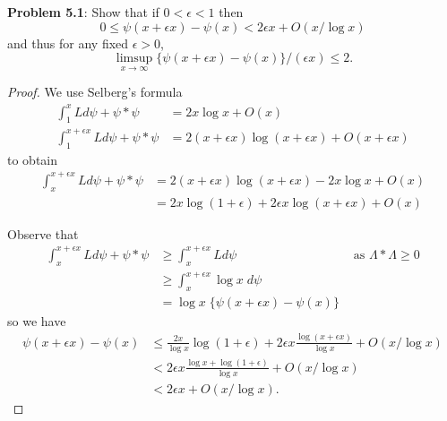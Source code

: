 \documentclass[12pt]{article}
\begin{document}
\fi

\textbf{Problem 5.1}: Show that if $0 < \epsilon < 1$ then
$$0 \leq \psi(x + \epsilon x) - \psi(x) < 2 \epsilon x + O(x / \log x)$$
and thus for any fixed $\epsilon > 0$,
$$\limsup_{x \rightarrow \infty} \{\psi(x + \epsilon x) - \psi(x)\}/(\epsilon x) \leq 2.$$

\begin{proof}
We use Selberg's formula
\begin{align*}
\int_1^x Ld\psi + \psi * \psi &= 2 x \log x + O(x)\\
\int_1^{x + \epsilon x} Ld\psi + \psi * \psi &= 2 (x + \epsilon x) \log (x + \epsilon x) + O(x + \epsilon x)
\end{align*}
to obtain
\begin{align*}
\int_x^{x + \epsilon x} Ld\psi + \psi * \psi &= 2 (x + \epsilon x) \log (x + \epsilon x) - 2 x \log x + O(x)\\
&= 2 x \log (1 + \epsilon) + 2 \epsilon x \log (x + \epsilon x) + O(x)
\end{align*}

Observe that
\begin{align*}
\int_x^{x + \epsilon x} Ld\psi + \psi * \psi &\geq \int_x^{x + \epsilon x} Ld\psi &\text{ as } \Lambda * \Lambda \geq 0 \\
&\geq \int_x^{x + \epsilon x} \log x \; d\psi\\
&= \log x \; \{ \psi(x + \epsilon x) - \psi(x) \}
\end{align*}
so we have
\begin{align*}
\psi(x + \epsilon x) - \psi(x) &\leq \frac{2 x}{\log x} \log (1 + \epsilon) + 2 \epsilon x \frac{\log (x + \epsilon x)}{\log x} + O(x / \log x)\\
&< 2 \epsilon x \frac{\log x + \log (1 + \epsilon)}{\log x} + O(x / \log x)\\
&< 2 \epsilon x + O(x / \log x).
\end{align*}
\end{proof}

\unless\ifdefined\IsMainDocument
\end{document}

